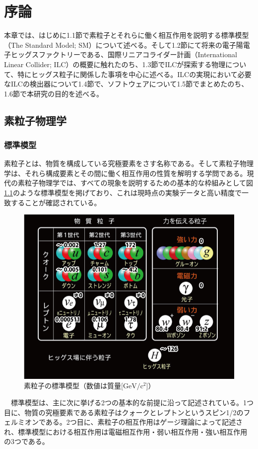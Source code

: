 
\chapter{序論} \label{sec:Intruduction}
本章では、はじめに1.1節で素粒子とそれらに働く相互作用を説明する標準模型（The Standard Model; SM）について述べる。そして1.2節にて将来の電子陽電子ヒッグスファクトリーである、国際リニアコライダー計画（International Linear Collider; ILC）の概要に触れたのち、1.3節でILCが探索する物理について、特にヒッグス粒子に関係した事項を中心に述べる。ILCの実現において必要なILCの検出器について1.4節で、ソフトウェアについて1.5節でまとめたのち、1.6節で本研究の目的を述べる。
\section{素粒子物理学}
\subsection{標準模型}
素粒子とは、物質を構成している究極要素をさす名称である。そして素粒子物理学は、それら構成要素とその間に働く相互作用の性質を解明する学問である。現代の素粒子物理学では、すべての現象を説明するための基本的な枠組みとして図\ref{sm}のような標準模型を掲げており、これは現時点の実験データと高い精度で一致することが確認されている。\\
\begin{figure}[ht]
	\begin{center}
 \includegraphics[keepaspectratio, scale=0.4]
 	{Figure/Introduction/sm.jpg}
 		\caption{素粒子の標準模型（数値は質量[$\mathrm{GeV/c^2}$]）}
 		\label{sm}
	\end{center}
\end{figure}
　標準模型は、主に次に挙げる2つの基本的な前提に沿って記述されている。1つ目に、物質の究極要素である素粒子はクォークとレプトンというスピン1/2のフェルミオンである。2つ目に、素粒子の相互作用はゲージ理論によって記述され、標準模型における相互作用は電磁相互作用・弱い相互作用・強い相互作用の3つである。

